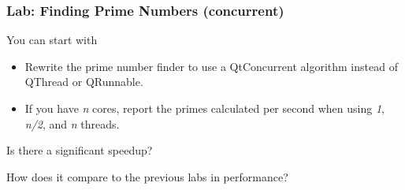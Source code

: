
\begin{slide}
\frametitle{Lab: Finding Prime Numbers (concurrent)}
You can start with 
\begin{itemize}
\item Rewrite the prime number finder to use a QtConcurrent algorithm instead of
QThread or QRunnable.
\item If you have \textit{n} cores, report the primes calculated per second when 
using \textit{1}, \textit{n/2}, and \textit{n} threads. 
\end{itemize}

Is there a significant speedup? 

How does it compare to the previous labs in performance?

\end{slide}


